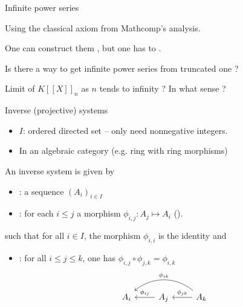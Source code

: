 \documentclass[compress,11pt]{beamer}
\renewcommand{\emph}[1]{{\color{red} #1}}
\begin{document}
\begin{frame}{Infinite power series}

  Using the classical axiom from Mathcomp's analysis.
  \bigskip

  \begin{PROBLEM}
    One can construct them , but one has to .
  \end{PROBLEM}
  \bigskip\bigskip\pause

  \begin{QUESTION}
    Is there a way to get infinite power series from truncated one ?
  \end{QUESTION}
  \bigskip\pause

  Limit of $K[[X]]_n$ as $n$ tends to infinity ? In what sense ?
\end{frame}

\begin{frame}[fragile]{Inverse (projective) systems}

  \begin{itemize}
  \item $I$: ordered directed set -- only need nonnegative integers.
  \item In an algebraic category (e.g. ring with ring morphisms)
  \end{itemize}
  \begin{DEFN}
    An \emph{inverse system} is given by
    \begin{itemize}
    \item {}: a sequence $(A_i)_{i\in I}$
    \item {}: for each $i\leq j$ a morphism
      $\phi_{i,j}: A_j\mapsto A_i$ ().
    \end{itemize}
    such that for all $i\in I$, the morphism $\phi_{i,i}$ is the identity and
    \begin{itemize}
    \item {}: for all $i \leq j \leq k$, one has
      $\phi_{i,j} \circ \phi_{j,k} = \phi_{i,k}$
      \vskip-3mm
\[
\begin{tikzcd}%
  A_{i}
  & A_{j} \arrow[l,"\phi_{ij}",swap]
  & A_{k} \arrow[l,"\phi_{jk}",swap] \arrow[ll,"\phi_{ik}",bend
  right=40,swap]
\end{tikzcd}
\]
\end{itemize}
  \end{DEFN}
\end{frame}
\end{document}
